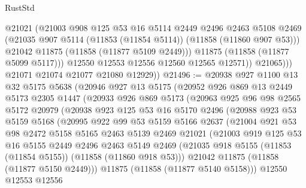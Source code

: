 \begin{lexlean}{RustStd}
\begin{coremodule}
                    @21021
                    (@21003
                      @908
                      @125
                      @53
                      @16
                      @5114
                      @2449
                      @2496
                      @2463
                      @5108
                      @2469
                      (@21035 @907 @5114 (@11853 (@11854 @5114)) (@11858 (@11860 @907 @53)))
                      @21042
                      @11875
                      (@11858 (@11877 @5109 @2449)))
                    @11875
                    (@11858 (@11877 @5099 @5117)))
                  @12550
                  @12553
                  @12556
                  @12560
                  @12565
                  @12571))
              @21065)))
        @21071
        @21074
        @21077
        @21080
        @12929))
@21496 := @20938
    @927
    @1100
    @13
    @32
    @5175
    @5638
    (@20946
      @927
      @13
      @5175
      (@20952
        @926
        @869
        @13
        @2449
        @5173
        @2305
        @1447
        (@20933
          @926
          @869
          @5173
          (@20963
            @925
            @96
            @98
            @2565
            @5172
            @20979
            (@20938
              @923
              @125
              @53
              @16
              @5170
              @2496
              (@20988
                @923
                @53
                @5159
                @5168
                (@20995
                  @922
                  @99
                  @53
                  @5159
                  @5166
                  @2637
                  (@21004
                    @921
                    @53
                    @98
                    @2472
                    @5158
                    @5165
                    @2463
                    @5139
                    @2469
                    @21021
                    (@21003
                      @919
                      @125
                      @53
                      @16
                      @5155
                      @2449
                      @2496
                      @2463
                      @5149
                      @2469
                      (@21035 @918 @5155 (@11853 (@11854 @5155)) (@11858 (@11860 @918 @53)))
                      @21042
                      @11875
                      (@11858 (@11877 @5150 @2449)))
                    @11875
                    (@11858 (@11877 @5140 @5158)))
                  @12550
                  @12553
                  @12556

\end{coremodule}
\end{lexlean}
